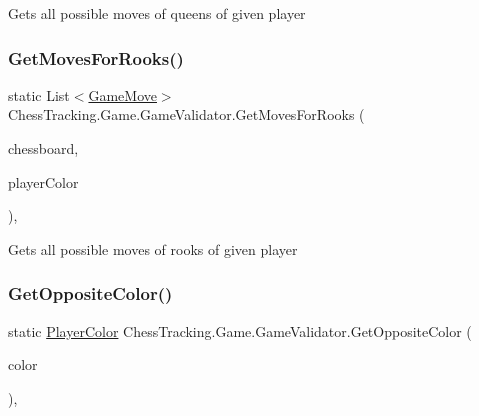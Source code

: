 Gets all possible moves of queens of given player 

\mbox{\label{class_chess_tracking_1_1_game_1_1_game_validator_a98518e2fd8e0ce4768cb254a402c6c82}} 
\subsubsection{\texorpdfstring{GetMovesForRooks()}{GetMovesForRooks()}}
{\footnotesize\ttfamily static List$<$\mbox{\hyperlink{class_chess_tracking_1_1_game_1_1_game_move}{Game\+Move}}$>$ Chess\+Tracking.\+Game.\+Game\+Validator.\+Get\+Moves\+For\+Rooks (\begin{DoxyParamCaption}\item[{\mbox{\hyperlink{class_chess_tracking_1_1_game_1_1_chessboard_model}{Chessboard\+Model}}}]{chessboard,  }\item[{\mbox{\hyperlink{namespace_chess_tracking_1_1_game_ab79070a55977a8c8326e9cdda7dcfa9a}{Player\+Color}}}]{player\+Color }\end{DoxyParamCaption})\hspace{0.3cm}{\ttfamily [static]}, {\ttfamily [private]}}



Gets all possible moves of rooks of given player 

\mbox{\label{class_chess_tracking_1_1_game_1_1_game_validator_a7708ca21ef7efd32215c32570b757668}} 
\subsubsection{\texorpdfstring{GetOppositeColor()}{GetOppositeColor()}}
{\footnotesize\ttfamily static \mbox{\hyperlink{namespace_chess_tracking_1_1_game_ab79070a55977a8c8326e9cdda7dcfa9a}{Player\+Color}} Chess\+Tracking.\+Game.\+Game\+Validator.\+Get\+Opposite\+Color (\begin{DoxyParamCaption}\item[{\mbox{\hyperlink{namespace_chess_tracking_1_1_game_ab79070a55977a8c8326e9cdda7dcfa9a}{Player\+Color}}}]{color }\end{DoxyParamCaption})\hspace{0.3cm}{\ttfamily [static]}, {\ttfamily [private]}}



